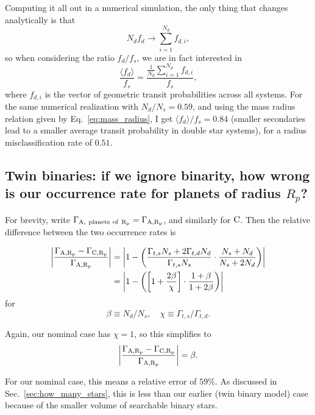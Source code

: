 \documentclass{emulateapj}
\begin{document}
Computing it all out in a numerical simulation, the only thing that changes 
analytically is that
\begin{equation}
N_d f_d \rightarrow \sum_{i=1}^{N_d} f_{d,i},
\end{equation}
so when considering the ratio $f_d/f_s$, we are in fact interested in
\begin{equation}
\frac{\langle f_d \rangle}{f_s} = \frac{\frac{1}{N_d} \sum_{i=1}^{N_d} 
f_{d,i}}{f_s},
\end{equation}
where $f_{d,i}$ is the vector of geometric transit probabilities across all 
systems.
For the same numerical realization with $N_d/N_s = 0.59$, and using the mass 
radius relation given by Eq.~\ref{eq:mass_radius}, I get $\langle f_d 
\rangle / f_s = 0.84$ (smaller secondaries lead to a smaller average transit 
probability in double star systems), for a radius misclassification rate of 
$0.51$.



\subsection{Twin binaries: if we ignore binarity, how wrong is our occurrence 
	rate for planets of radius $R_p$?}

For brevity, write $\Gamma_{\rm A,\ planets\ of\ R_p} = \Gamma_{\rm A,R_p}$, 
and similarly for ${\rm C}$.
Then the relative difference between the two occurrence rates is

\begin{align}
\left|\frac{\Gamma_{\rm A,R_p} - \Gamma_{\rm C,R_p}}
{\Gamma_{\rm A,R_p}} \right| 
&=
\left| 1 - \left(
\frac{\Gamma_{t,s}N_s + 2\Gamma_{t,d}N_d}{\Gamma_{t,s} N_s }  
\cdot 
\frac{N_s + N_d}{N_s + 2N_d }
\right) \right|  \\
&=
\left| 1 - \left(
\left[ 1 + \frac{2\beta}{\chi} \right]
\cdot 
\frac{1 + \beta}{1 + 2\beta }
\right) \right|
\end{align}
for
\begin{equation}
\beta \equiv N_d/N_s, \quad \chi \equiv \Gamma_{t,s}/\Gamma_{t,d}.
\end{equation}

Again, our nominal case has $\chi = 1$, so this simplifies to
\begin{equation}
\left|\frac{\Gamma_{\rm A,R_p} - \Gamma_{\rm C,R_p}}
{\Gamma_{\rm A,R_p}} \right| = \beta.
\end{equation}

For our nominal case, this means a relative error of $59\%$.
As discussed in Sec.~\ref{sec:how_many_stars}, this is less than our earlier 
(twin binary model) case because of the smaller volume of searchable binary 
stars.


\newpage





\end{document}
